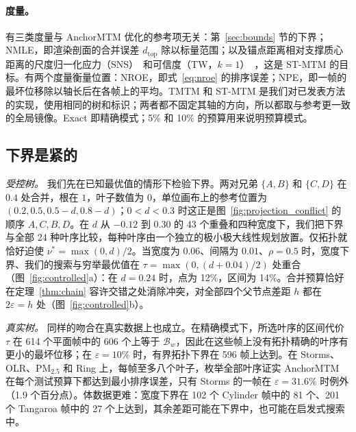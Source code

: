 \documentclass[preprint]{vgtc_zh}   %
\newcommand{\dtop}{d_{\mathrm{top}}}
\begin{document}
\paragraph{度量。} 有三类度量与 AnchorMTM 优化的参考项无关：第~\ref{sec:bounds} 节的下界；NMLE，即渲染剖面的合并误差 $\dtop$ 除以标量范围；以及锚点距离相对支撑质心距离的尺度归一化应力（SNS）~\cite{Smelser:2025:Scale,STMTM:2026}和可信度（TW，$k=1$）~\cite{Venna:2001:NP}，这是 ST-MTM 的目标。有两个度量衡量位置：NROE，即式~\ref{eq:nroe} 的排序误差；NPE，即一帧的最坏位移除以轴长后在各帧上的平均。TMTM 和 ST-MTM 是我们对已发表方法的实现，使用相同的树和标识；两者都不固定其轴的方向，所以都取与参考更一致的全局镜像。Exact 即精确模式；5\% 和 10\% 的预算用来说明预算模式。

\subsection{下界是紧的}\label{sec:bounds-eval}
\emph{受控树。} 我们先在已知最优值的情形下检验下界。两对兄弟 $\{A,B\}$ 和 $\{C,D\}$ 在 $0.4$ 处合并，根在 $1$，叶子数值为 $0$，单位画布上的参考位置为 $(0.2,0.5,0.5-d,0.8-d)$；$0<d<0.3$ 时这正是图~\ref{fig:projection_conflict} 的顺序 $A,C,B,D$。在 $d$ 从 $-0.12$ 到 $0.30$ 的 43 个重叠和四种宽度下，我们把下界与全部 24 种叶序比较，每种叶序由一个独立的极小极大线性规划放置。仅拓扑就恰好迫使 $\nu^*=\max(0,d)/2$。当宽度为 $0.06$、间隔为 $0.01$、$\rho=0.5$ 时，宽度下界、我们的搜索与穷举最优值在 $\tau=\max(0,(d+0.04)/2)$ 处重合（图~\ref{fig:controlled}a）：在 $d=0.24$ 时，点为 12\%，区间为 14\%。合并预算恰好在定理~\ref{thm:chain} 容许交错之处消除冲突，对全部四个父节点差距 $h$ 都在 $2\varepsilon=h$ 处（图~\ref{fig:controlled}b）。

\emph{真实树。} 同样的吻合在真实数据上也成立。在精确模式下，所选叶序的区间代价 $\tau$ 在 614 个平面帧中的 606 个上等于 $\mathcal{B}_w$，因此在这些帧上没有拓扑精确的叶序有更小的最坏位移；在 $\varepsilon=10\%$ 时，有界拓扑下界在 596 帧上达到。在 Storms、OLR、PM$_{2.5}$ 和 Ring 上，每帧至多八个叶子，枚举全部叶序证实 AnchorMTM 在每个测试预算下都达到最小排序误差，只有 Storms 的一帧在 $\varepsilon=31.6\%$ 时例外（1.9 个百分点）。体数据更难：宽度下界在 102 个 Cylinder 帧中的 81 个、201 个 Tangaroa 帧中的 27 个上达到，其余差距可能在下界中，也可能在启发式搜索中。
\end{document}
